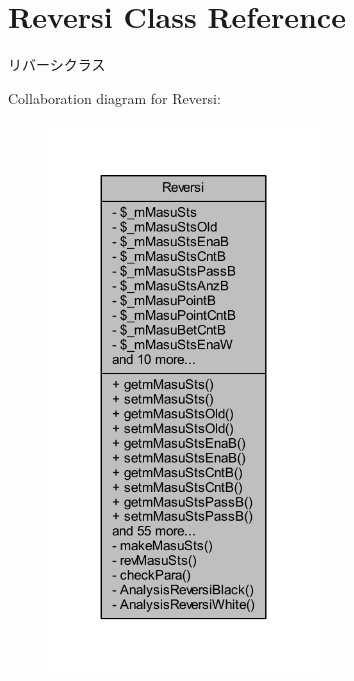 \hypertarget{class_reversi}{}\section{Reversi Class Reference}
\label{class_reversi}


リバーシクラス  




Collaboration diagram for Reversi\+:\nopagebreak
\begin{figure}[H]
\begin{center}
\leavevmode
\includegraphics[width=203pt]{class_reversi__coll__graph}
\end{center}
\end{figure}
